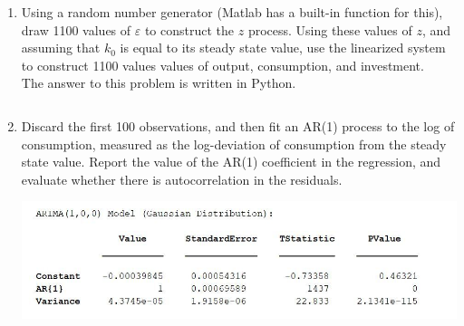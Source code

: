 \documentclass[11pt]{article}
\begin{document}
\begin{enumerate}
\newpage
\item Using a random number generator (Matlab has a built-in function for
this), draw 1100 values of $\varepsilon$ to construct the $z$ process. Using these values of $z$,
and assuming that $k_0$ is equal to its steady state value, use the linearized system
to construct 1100 values values of output, consumption, and investment.
\\ The answer to this problem is written in Python.
\inputminted{python}{q8.py}

\newpage
\item Discard the first 100 observations, and then fit an AR(1) process to the
log of consumption, measured as the log-deviation of consumption from the
steady state value. Report the value of the AR(1) coefficient in the regression,
and evaluate whether there is autocorrelation in the residuals.



\begin{center}
\includegraphics[scale=0.75]{MacroHW2_Q9.JPG}
\end{center}


\end{enumerate}
\end{document}
